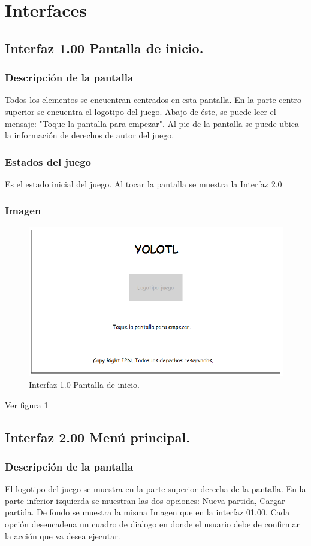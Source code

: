 \documentclass[11pt,letterpaper]{article}
\begin{document}
\section{Interfaces}
	\subsection{Interfaz 1.00 Pantalla de inicio.}
	\subsubsection{Descripción de la pantalla}
Todos los elementos se encuentran centrados en esta pantalla. En la parte centro superior se encuentra el logotipo del juego. Abajo de éste, se puede leer el mensaje: "Toque la pantalla para empezar". Al pie de la pantalla se puede ubica la información de derechos de autor del juego.
	\subsubsection{Estados del juego}
Es el estado inicial del juego.
Al tocar la pantalla se muestra la Interfaz 2.0
	\subsubsection{Imagen}
\begin{figure}
  \centering
   \includegraphics[width=0.6 \textwidth]{Imagenes/interfaz00}
  \caption{Interfaz 1.0 Pantalla de inicio.}
  \label{fig:PInicio}
\end{figure} 

Ver figura \ref{fig:PInicio}


\subsection{Interfaz 2.00 Menú principal.}
	\subsubsection{Descripción de la pantalla}
El logotipo del juego se muestra en la parte superior derecha de la pantalla. En la parte inferior izquierda se muestran las dos opciones: Nueva partida, Cargar partida. De fondo se muestra la misma Imagen que en la interfaz 01.00. 
Cada opción desencadena un cuadro de dialogo en donde el usuario debe de confirmar la acción que va desea ejecutar.
\end{document}
